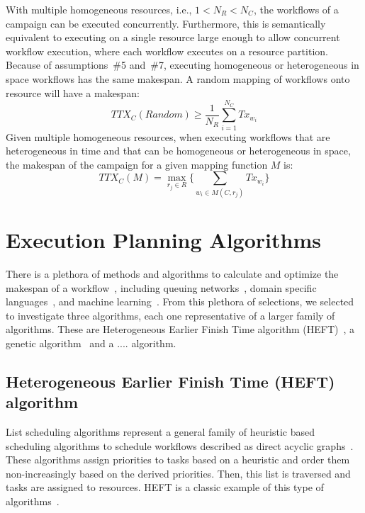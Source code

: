 With multiple homogeneous resources, i.e., $1 < N_{R} < N_{C}$, the workflows of a campaign can be executed concurrently.
Furthermore, this is semantically equivalent to executing on a single resource large enough to allow concurrent workflow execution, where each workflow executes on a resource partition. 
Because of assumptions~\#5 and~\#7, executing homogeneous or heterogeneous in space workflows has the same makespan.
A random mapping of workflows onto resource will have a makespan:
\begin{equation}
   TTX_{C}(Random) \geq \frac{1}{N_{R}}\sum_{i=1}^{N_{C}} Tx_{w_{i}} 
\end{equation}
Given multiple homogeneous resources, when executing workflows that are heterogeneous in time and that can be homogeneous or heterogeneous in space, the makespan of the campaign for a given mapping function $ M $ is:
\begin{equation}
TTX_{C}(M) = \max_{r_{j}\in R}\Big\{\sum_{w_{i}\in M(C,r_{j})}Tx_{w_{i}}\Big\}
\label{eq:makespan}
\end{equation}

\section{Execution Planning Algorithms}
\label{sec:algo}

There is a plethora of methods and algorithms to calculate and optimize the makespan of a workflow~\cite{lu2019review}, including queuing networks~\cite{yao2019throughput,bao2019performance}, domain specific languages~\cite{carothers2017durango,maheshwari2016workflow}, and machine learning~\cite{witt2019predictive,pumma2017runtime}.
From this plethora of selections, we selected to investigate three algorithms, each one representative of a larger family of algorithms.
These are Heterogeneous Earlier Finish Time algorithm (HEFT)~\cite{topcuoglu2002performance}, a genetic algorithm~\cite{page2005algorithm} and a .... algorithm.

\subsection{Heterogeneous Earlier Finish Time (HEFT) algorithm}
\label{algo:heft}
List scheduling algorithms represent a general family of heuristic based scheduling algorithms to schedule workflows described as direct acyclic graphs~\cite{dong2006scheduling,list_sched_wiki}. 
These algorithms assign priorities to tasks based on a heuristic and order them non-increasingly based on the derived priorities.
Then, this list is traversed and tasks are assigned to resources.
HEFT is a classic example of this type of algorithms~\cite{dong2006scheduling}.

